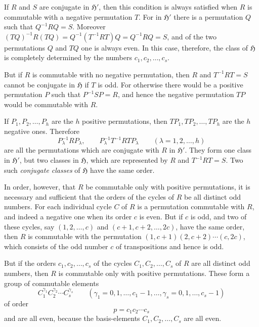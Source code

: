 \documentclass[11pt]{article}
\newcommand{\Hgr}{\mathfrak{H}}
\begin{document}
If $R$ and $S$ are conjugate in $\Hgr'$, then this condition is always satisfied when $R$ is commutable with a negative permutation $T$. For in $\Hgr'$ there is a permutation $Q$ such that $Q^{-1}RQ=S$. Moreover $(TQ)^{-1}R(TQ)=Q^{-1}(T^{-1}RT)Q=Q^{-1}RQ=S$, and of the two permutations $Q$ and $TQ$ one is always even. In this case, therefore, the class of $\Hgr$ is completely determined by the numbers $c_1,c_2,\ldots,c_s$.

But if $R$ is commutable with no negative permutation, then $R$ and $T^{-1}RT=S$ cannot be conjugate in $\Hgr$ if $T$ is odd. For otherwise there would be a positive permutation $P$ such that $P^{-1}SP=R$, and hence the negative permutation $TP$ would be commutable with $R$.

If $P_1,P_2,\ldots,P_h$ are the $h$ positive permutations, then $TP_1,TP_2,\ldots,TP_h$ are the $h$ negative ones. Therefore
\[
 P_\lambda^{-1}RP_\lambda,\qquad P_\lambda^{-1}T^{-1}RTP_\lambda\qquad(\lambda=1,2,\ldots,h)
\]
are all the permutations which are conjugate with $R$ in $\Hgr'$. They form one class in $\Hgr'$, but two classes in $\Hgr$, which are represented by $R$ and $T^{-1}RT=S$. Two such \emph{conjugate classes} of $\Hgr$ have the same order.

In order, however, that $R$ be commutable only with positive permutations, it is necessary and sufficient that the orders of the cycles of $R$ be all distinct odd numbers. For each individual cycle $C$ of $R$ is a permutation commutable with $R$, and indeed a negative one when its order $c$ is even. But if $c$ is odd, and two of these cycles, say $(1,2,\ldots,c)$ and $(c+1,c+2,\ldots,2c)$, have the same order, then $R$ is commutable with the permutation $(1,c+1)(2,c+2)\cdots(c,2c)$, which consists of the odd number $c$ of transpositions and hence is odd.

But if the orders $c_1,c_2,\ldots,c_s$ of the cycles $C_1,C_2,\ldots,C_s$ of $R$ are all distinct odd numbers, then $R$ is commutable only with positive permutations. These form a group of commutable elements
\begin{equation}\tag{1.}
 C_1^{\gamma_1}C_2^{\gamma_2}\cdots C_s^{\gamma_s}\qquad(\gamma_1=0,1,\ldots,c_1-1,\ldots,\gamma_s=0,1,\ldots,c_s-1)
\end{equation}
of order
\begin{equation}\tag{2.}
 p=c_1c_2\cdots c_s
\end{equation}
and are all even, because the basis-elements $C_1,C_2,\ldots,C_s$ are all even.
\end{document}

